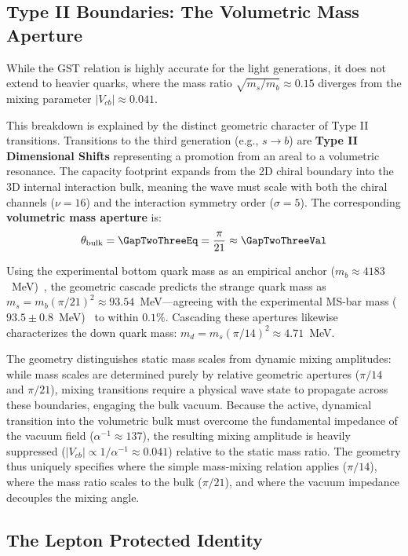\subsection{Type II Boundaries: The Volumetric Mass Aperture}

While the GST relation is highly accurate for the light generations, it does not extend to heavier quarks, where the mass ratio $\sqrt{m_s/m_b} \approx 0.15$ diverges from the mixing parameter $|V_{cb}| \approx 0.041$. 

This breakdown is explained by the distinct geometric character of Type II transitions. Transitions to the third generation (e.g., $s \to b$) are \textbf{Type II Dimensional Shifts} representing a promotion from an areal to a volumetric resonance. The capacity footprint expands from the 2D chiral boundary into the 3D internal interaction bulk, meaning the wave must scale with both the chiral channels ($\nu=16$) and the interaction symmetry order ($\sigma=5$). The corresponding \textbf{volumetric mass aperture} is:
\begin{equation}
    \theta_{\text{bulk}} = \GapTwoThreeEq = \frac{\pi}{21} \approx \GapTwoThreeVal
\end{equation}

Using the experimental bottom quark mass as an empirical anchor ($m_b \approx 4183$~MeV)~\cite{navas_review_2024}, the geometric cascade predicts the strange quark mass as $m_s = m_b (\pi/21)^2 \approx 93.54$~MeV—agreeing with the experimental MS-bar mass ($93.5 \pm 0.8$~MeV)~\cite{navas_review_2024} to within $0.1\%$. Cascading these apertures likewise characterizes the down quark mass: $m_d = m_s (\pi/14)^2 \approx 4.71$~MeV. 

The geometry distinguishes static mass scales from dynamic mixing amplitudes: while mass scales are determined purely by relative geometric apertures ($\pi/14$ and $\pi/21$), mixing transitions require a physical wave state to propagate across these boundaries, engaging the bulk vacuum. Because the active, dynamical transition into the volumetric bulk must overcome the fundamental impedance of the vacuum field ($\alpha^{-1} \approx 137$), the resulting mixing amplitude is heavily suppressed ($|V_{cb}| \propto 1/\alpha^{-1} \approx 0.041$) relative to the static mass ratio. The geometry thus uniquely specifies where the simple mass-mixing relation applies ($\pi/14$), where the mass ratio scales to the bulk ($\pi/21$), and where the vacuum impedance decouples the mixing angle.

\subsection{The Lepton Protected Identity}

